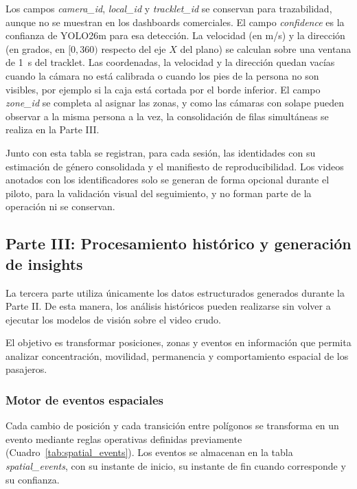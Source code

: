 \documentclass[12pt,letterpaper]{article}
\begin{document}
Los campos \textit{camera\_id}, \textit{local\_id} y
\textit{tracklet\_id} se conservan para trazabilidad, aunque no se
muestran en los dashboards comerciales. El campo \textit{confidence} es
la confianza de YOLO26m para esa detección. La velocidad (en m/s) y la
dirección (en grados, en $[0,360)$ respecto del eje $X$ del plano) se
calculan sobre una ventana de 1~s del tracklet. Las coordenadas, la
velocidad y la dirección quedan vacías cuando la cámara no está
calibrada o cuando los pies de la persona no son visibles, por ejemplo
si la caja está cortada por el borde inferior. El campo \textit{zone\_id}
se completa al asignar las zonas, y como las cámaras con solape pueden
observar a la misma persona a la vez, la consolidación de filas
simultáneas se realiza en la Parte III.

Junto con esta tabla se registran, para cada sesión, las identidades
con su estimación de género consolidada y el manifiesto de
reproducibilidad. Los videos anotados con los identificadores solo se
generan de forma opcional durante el piloto, para la validación visual
del seguimiento, y no forman parte de la operación ni se conservan.

\subsection{Parte III: Procesamiento histórico y generación de insights}

La tercera parte utiliza únicamente los datos estructurados generados
durante la Parte II. De esta manera, los análisis históricos pueden
realizarse sin volver a ejecutar los modelos de visión sobre el video
crudo.

El objetivo es transformar posiciones, zonas y eventos en información
que permita analizar concentración, movilidad, permanencia y
comportamiento espacial de los pasajeros.

\subsubsection{Motor de eventos espaciales}

Cada cambio de posición y cada transición entre polígonos se transforma
en un evento mediante reglas operativas definidas previamente
(Cuadro~\ref{tab:spatial_events}). Los eventos se almacenan en la tabla
\textit{spatial\_events}, con su instante de inicio, su instante de fin
cuando corresponde y su confianza.
\end{document}
